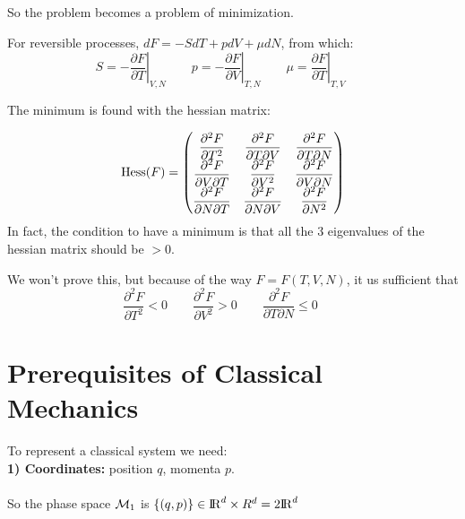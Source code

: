 So the problem becomes a problem of minimization.\\

For reversible processes, $dF = -SdT + pdV + \mu dN$, from which:
$$ S = \left. -\frac{\partial F}{\partial T}\right|_{V,N} \qquad
p = \left. -\frac{\partial F}{\partial V}\right|_{T,N} \qquad
\mu = \left. \frac{\partial F}{\partial T}\right|_{T,V} \qquad
$$

The minimum is found with the hessian matrix:
\begingroup
\renewcommand*{\arraystretch}{2.5}

$$\operatorname{Hess} (F) = \begin{pmatrix} 
\dfrac{\partial^2 F}{\partial T ^2} & \dfrac{\partial^2 F}{\partial T \partial V} & \dfrac{\partial^2 F}{\partial T \partial N} \\
\dfrac{\partial^2 F}{\partial V \partial T} & \dfrac{\partial^2 F}{\partial V^2} & \dfrac{\partial^2 F}{\partial V \partial N} \\
\dfrac{\partial^2 F}{\partial N \partial T} & \dfrac{\partial^2 F}{\partial N \partial V} & \dfrac{\partial^2 F}{\partial N^2}
\end{pmatrix}$$
\endgroup
In fact, the condition to have a minimum is that all the 3 eigenvalues of the hessian matrix should be $>0$.


We won't prove this, but because of the way $ F = F(T,V,N)$, it us sufficient that
$$ \frac{\partial ^2 F}{\partial T^2} < 0 \qquad
\frac{\partial ^2 F}{\partial V^2} > 0 \qquad 
\frac{\partial ^2 F}{\partial T\partial N} \le 0 \qquad 
$$


\section{Prerequisites of Classical Mechanics}
To represent a classical system we need:\\

\textbf{1) Coordinates:} position $q$, momenta $p$.\\
\\
So the phase space $\mathcal{M}_1$ is $\{(q,p)\} \in {\rm I\!R}^d \times R^d = 2{\rm I\!R}^d$\\

